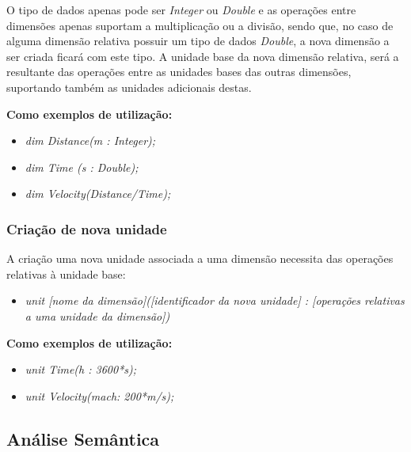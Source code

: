 \documentclass[10pt,portuguese]{article}
\begin{document}
\par O tipo de dados apenas pode ser \textit{Integer} ou \textit{Double} e as operações entre dimensões apenas suportam a multiplicação ou a divisão, sendo que, no caso de alguma dimensão relativa possuir um tipo de dados \textit{Double}, a nova dimensão a ser criada ficará com este tipo. A unidade base da nova dimensão relativa, será a resultante das operações entre as unidades bases das outras dimensões, suportando também as unidades adicionais destas.

\textbf{Como exemplos de utilização:}

\begin{itemize}
    \item \textit{dim Distance(m : Integer);}
    \item \textit{dim Time (s : Double);}
    \item \textit{dim Velocity(Distance/Time);}
\end{itemize}

\subsubsection{Criação de nova unidade}

\par A criação uma nova unidade associada a uma dimensão necessita das operações relativas à unidade base:

\begin{itemize}
    \item \textit{unit [nome da dimensão]([identificador da nova unidade] : [operações relativas a uma unidade da dimensão])}
\end{itemize}

\textbf{Como exemplos de utilização:}

\begin{itemize}
    \item \textit{unit Time(h : 3600*s);}
    \item \textit{unit Velocity(mach: 200*m/s);}
\end{itemize}

\subsection{Análise Semântica}
\end{document}

